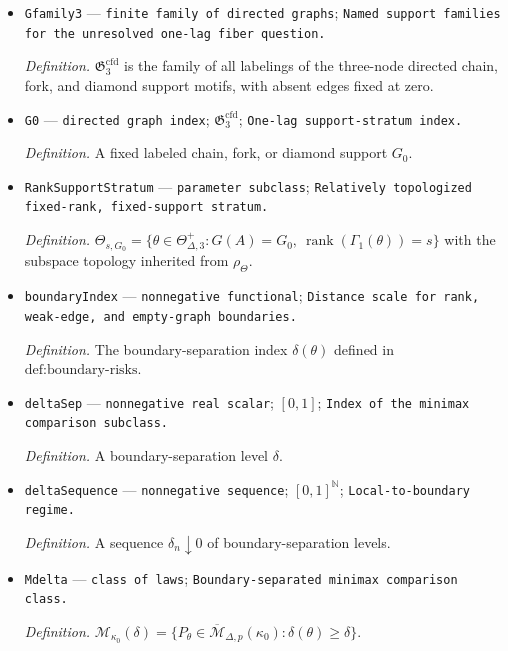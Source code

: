 \documentclass{article}
\begin{document}
\begin{itemize}
  \item \texttt{Gfamily3} --- \texttt{finite family of directed graphs}; \texttt{Named support families for the unresolved one-\allowbreak{}lag fiber question.}
  \par\smallskip\noindent\emph{Definition.} \(\mathfrak G_3^{\mathrm{cfd}}\) is the family of all labelings of the three-node directed chain, fork, and diamond support motifs, with absent edges fixed at zero.
  \item \texttt{G0} --- \texttt{directed graph index}; \(\mathfrak G_3^{\mathrm{cfd}}\); \texttt{One-\allowbreak{}lag support-\allowbreak{}stratum index.}
  \par\smallskip\noindent\emph{Definition.} A fixed labeled chain, fork, or diamond support \(G_0\).
  \item \texttt{RankSupportStratum} --- \texttt{parameter subclass}; \texttt{Relatively topologized fixed-\allowbreak{}rank,\allowbreak{} fixed-\allowbreak{}support stratum.}
  \par\smallskip\noindent\emph{Definition.} \(\Theta_{s,G_0}=\{\theta\in\Theta_{\Delta,3}^{+}:G(A)=G_0,\ \operatorname{rank}(\Gamma_1(\theta))=s\}\) with the subspace topology inherited from \(\rho_{\Theta}\).
  \item \texttt{boundaryIndex} --- \texttt{nonnegative functional}; \texttt{Distance scale for rank,\allowbreak{} weak-\allowbreak{}edge,\allowbreak{} and empty-\allowbreak{}graph boundaries.}
  \par\smallskip\noindent\emph{Definition.} The boundary-separation index \(\delta(\theta)\) defined in \(\text{def:boundary-risks}\).
  \item \texttt{deltaSep} --- \texttt{nonnegative real scalar}; \([0,1]\); \texttt{Index of the minimax comparison subclass.}
  \par\smallskip\noindent\emph{Definition.} A boundary-separation level \(\delta\).
  \item \texttt{deltaSequence} --- \texttt{nonnegative sequence}; \([0,1]^{\mathbb N}\); \texttt{Local-\allowbreak{}to-\allowbreak{}boundary regime.}
  \par\smallskip\noindent\emph{Definition.} A sequence \(\delta_n\downarrow0\) of boundary-separation levels.
  \item \texttt{Mdelta} --- \texttt{class of laws}; \texttt{Boundary-\allowbreak{}separated minimax comparison class.}
  \par\smallskip\noindent\emph{Definition.} \(\mathcal M_{\kappa_0}(\delta)=\{P_{\theta}\in\overline{\mathcal M}_{\Delta,p}(\kappa_0):\delta(\theta)\geq\delta\}\).

\end{itemize}
\end{document}
